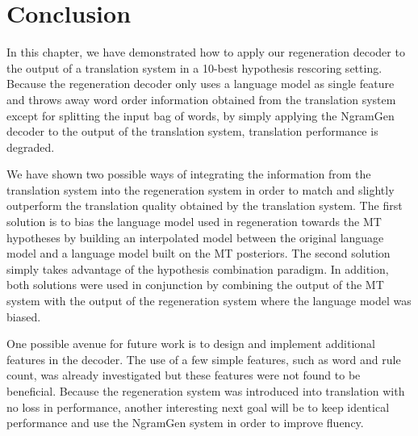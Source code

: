 \section{Conclusion}

In this chapter, we have demonstrated how to apply our regeneration
decoder to the output of a translation system in a 10-best hypothesis
rescoring setting. Because the regeneration decoder only uses
a language model as single feature and throws away word order
information obtained from the translation system except for splitting
the input bag of words, by simply
applying the NgramGen decoder to the output of the translation system, translation
performance is degraded.

We have shown two possible ways of integrating the information from the
translation system into the regeneration system in order to match
and slightly outperform the translation quality obtained by the
translation system. The first solution is to bias the language
model used in regeneration towards the MT hypotheses by building an interpolated
model between the original language model and a language model built on the MT
posteriors. The second
solution simply takes advantage of the hypothesis combination paradigm.
In addition, both solutions were used in conjunction by combining the output
of the MT system with the output of the regeneration system where the language model
was biased.

One possible avenue for future work is to design and implement additional
features in the decoder. The use of a few simple features, such as word and rule count, was
already investigated but these features were not found to be beneficial.
Because the regeneration system was introduced into translation with no loss
in performance, another interesting next goal will be to keep identical performance
and use the NgramGen system in order to improve fluency.

